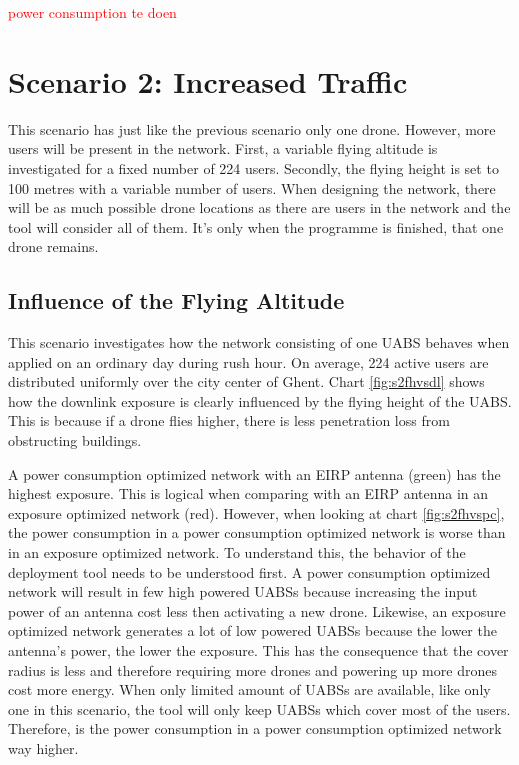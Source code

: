 \textcolor{red}{power consumption te doen}
\section{Scenario 2: Increased Traffic}

This scenario has just like the previous scenario only one drone. However, more users will be present in the network.
First, a variable flying altitude is investigated for a fixed number of 224 users. 
Secondly, the flying height is set to 100 metres with a variable number of users.
When designing the network, there will be as much possible drone locations as there are users in the network and the tool
will consider all of them. It's only when the programme is finished, that one drone remains.

\subsection{Influence of the Flying Altitude}
This scenario investigates how the network consisting of one \gls{UABS} behaves when applied on an ordinary day during rush hour. 
On average, 224 active users are distributed uniformly over the city center of Ghent. 
Chart \ref{fig:s2fhvsdl} shows how the downlink exposure is clearly influenced by the flying height of the \gls{UABS}. 
This is because if a drone flies higher, there is less penetration loss from obstructing buildings.

A power consumption optimized network with an \gls{EIRP} antenna (green) has the highest exposure. 
This is logical when comparing with an EIRP antenna in an exposure optimized network (red). 
However, when looking at chart \ref{fig:s2fhvspc}, the power consumption in a power consumption optimized network is worse 
than in an exposure optimized network. To understand this, the behavior of the deployment tool needs to be understood first. 
A power consumption optimized network will result in few high powered \gls{UABS}s because increasing the input power of an antenna cost 
less then activating a new  drone. Likewise, an exposure optimized network 
generates a lot of low powered \gls{UABS}s because the lower the antenna's power, the lower the exposure. This has the consequence that the cover radius 
is less and therefore requiring more drones and powering up more drones cost more energy.
When only limited amount of \gls{UABS}s are available, 
like only one in this scenario, the tool will only keep \gls{UABS}s which cover most of the users. 
Therefore, is the power consumption in a power consumption optimized network way higher. 


